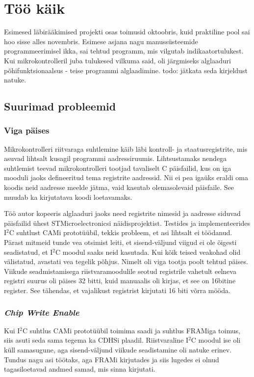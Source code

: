 \documentclass[12pt,a4paper]{article}
\newcommand{\iic}{I${}^2$C }
\begin{document}
\section{Töö käik}
Esimesed läbirääkimised projekti osas toimusid oktoobris, kuid praktiline pool
sai hoo sisse alles novembris. Esimese asjana nagu manussüsteemide
programmeerimisel ikka, sai tehtud programm, mis vilgutab indikaatortulukest.
Kui mikrokontrolleril juba tulukesed vilkuma said, oli järgmiseks alglaaduri
põhifunktsionaalsus - teise programmi alglaadimine. todo: jätkata seda kirjeldust
natuke.

\subsection{Suurimad probleemid}
\subsubsection{Viga päises}
Mikrokontrolleri riitvaraga suhtlemine käib läbi kontroll- ja staatusregistrite,
mis asuvad lihtsalt kusagil programmi aadressiruumis. Lihtsustamaks nendega
suhtlemist teevad mikrokontrolleri tootjad tavaliselt C päisfailid, kus on iga
mooduli jaoks defineeritud tema registrite aadressid. Nii ei pea igaüks eraldi
oma koodis neid aadresse meelde jätma, vaid kasutab olemasolevaid päisfaile. See
muudab ka kirjutatava koodi loetavamaks.

Töö autor kopeeris alglaaduri jaoks need registrite nimesid ja aadresse siduvad
päisfailid ühest STMicroelectronicsi näidisprojektist. Testides ja
implementeerides \iic suhtlust CAMi prototüübil, tekkis probleem, et asi
lihtsalt ei töödanud. Pärast mitmeid tunde vea otsimist leiti, et
sisend-väljund viigud ei ole õigesti seadistatud, et \iic moodul saaks neid
kasutada. Kui kõik teised veakohad olid välistatud, avastati vea tegelik põhjus.
Nimelt oli viga tootja poolt tehtud päises. Viikude seadmistamisega
riistvaramoodulile seotud registrile vahetult eelneva registri suurus oli päises
32 bitti, kuid manuaalis oli kirjas, et see on 16bitine register. See tähendas,
et vajalikust registrist kirjutati 16 biti võrra mööda. 
\subsubsection{\textit{Chip Write Enable}}
Kui \iic suhtlus CAMi prototüübil toimima saadi ja suhtlus FRAMiga toimus, siis
asuti seda sama tegema ka CDHSi plaadil. Riistvaraline \iic moodul ise oli küll
samasugune, aga sisend-väljund viikude seadistamine oli natuke erinev. Tundus
nagu asi töötaks, aga FRAMi kirjutades ja siis lugedes ei olnud tagasiloetavad
andmed samad, mis sinna kirjutati.
\end{document}
